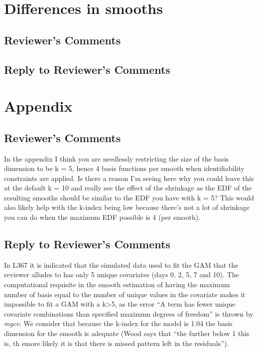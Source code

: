 \documentclass[
]{article}
\begin{document}
\hypertarget{differences-in-smooths}{%
\section{Differences in smooths}\label{differences-in-smooths}}

\hypertarget{reviewers-comments-8}{%
\subsection{Reviewer's Comments}\label{reviewers-comments-8}}

\hypertarget{section-9}{%
\subsection{\texorpdfstring{\textcolor{reviewersblue} {Reply to Reviewer's Comments}}{}}\label{section-9}}

\hypertarget{appendix}{%
\section{Appendix}\label{appendix}}

\hypertarget{reviewers-comments-9}{%
\subsection{Reviewer's Comments}\label{reviewers-comments-9}}

In the appendix I think you are needlessly restricting the size of the basis dimension to be k = 5, hence 4 basis functions per smooth when identifiability constraints are applied. Is there a reason I'm seeing here why you could leave this at the default k = 10 and really see the effect of the shrinkage as the EDF of the resulting smooths should be similar to the EDF you have with k = 5? This would also likely help with the k-index being low because there's not a lot of shrinkage you can do when the maximum EDF possible is 4 (per smooth).

\hypertarget{section-10}{%
\subsection{\texorpdfstring{\textcolor{reviewersblue} {Reply to Reviewer's Comments}}{}}\label{section-10}}

In L367 it is indicated that the simulated data used to fit the GAM that the reviewer alludes to has only 5 unique covariates (days 0, 2, 5, 7 and 10). The computational requisite in the smooth estimation of having the maximum number of basis equal to the number of unique values in the covariate makes it impossible to fit a GAM with a k\textgreater5, as the error ``A term has fewer unique covariate combinations than specified maximum degrees of freedom'' is thrown by \emph{mgcv}. We consider that because the k-index for the model is 1.04 the basis dimension for the smooth is adequate (Wood says that ``the further below 1 this is, th emore likely it is that there is missed pattern left in the residuals'').
\end{document}
